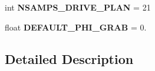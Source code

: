 \begin{DoxyCompactItemize}
\item 
int {\bfseries N\+S\+A\+M\+P\+S\+\_\+\+D\+R\+I\+V\+E\+\_\+\+P\+L\+AN} = 21\hypertarget{namespaceneedle__planner_a1ef45b5246dec11bcb9b1de1e0ef246c}{}\label{namespaceneedle__planner_a1ef45b5246dec11bcb9b1de1e0ef246c}

\item 
float {\bfseries D\+E\+F\+A\+U\+L\+T\+\_\+\+P\+H\+I\+\_\+\+G\+R\+AB} = 0.\hypertarget{namespaceneedle__planner_a625f99a558c630d91c77d166d090568c}{}\label{namespaceneedle__planner_a625f99a558c630d91c77d166d090568c}

\end{DoxyCompactItemize}


\subsection{Detailed Description}
